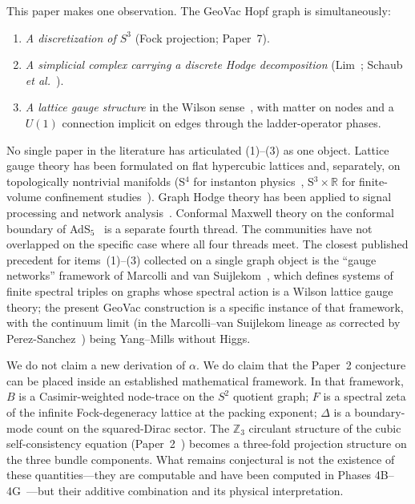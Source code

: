 \documentclass[aps,pra,twocolumn,superscriptaddress,longbibliography]{revtex4-2}
\begin{document}
This paper makes one observation.  The GeoVac Hopf graph is
simultaneously:
\begin{enumerate}
\item \emph{A discretization of $S^3$} (Fock projection; Paper~7).
\item \emph{A simplicial complex carrying a discrete Hodge
  decomposition} (Lim~\cite{Lim2020}; Schaub \emph{et
  al.}~\cite{Schaub2020}).
\item \emph{A lattice gauge structure} in the Wilson
  sense~\cite{Wilson1974}, with matter on nodes and a $U(1)$
  connection implicit on edges through the ladder-operator phases.
\end{enumerate}
No single paper in the literature has articulated (1)--(3) as one
object.  Lattice gauge theory has been formulated on flat hypercubic
lattices and, separately, on topologically nontrivial manifolds (S\({}^4\) for
instanton physics~\cite{BergLuscher1981,Luscher1982}, S\({}^3 \times
\mathbb{R}\) for finite-volume confinement
studies~\cite{Aharony2004}).  Graph Hodge theory has been applied to
signal processing and network analysis~\cite{Lim2020,Schaub2020}.
Conformal Maxwell theory on the conformal boundary of
AdS$_5$~\cite{EastwoodSinger1985,Maldacena1998} is a separate fourth
thread.  The communities have not overlapped on the specific case
where all four threads meet.  The closest published precedent for
items~(1)--(3) collected on a single graph object is the
``gauge networks'' framework of Marcolli and van
Suijlekom~\cite{MarcolliVanSuijlekom2014}, which defines systems of
finite spectral triples on graphs whose spectral action is a Wilson
lattice gauge theory; the present GeoVac construction is a specific
instance of that framework, with the continuum limit (in the
Marcolli--van Suijlekom lineage as corrected by
Perez-Sanchez~\cite{PerezSanchez2024,PerezSanchez2025Comment}) being
Yang--Mills without Higgs.

We do not claim a new derivation of $\alpha$.  We do claim that the
Paper~2 conjecture can be placed inside an established mathematical
framework.  In that framework, $B$ is a Casimir-weighted node-trace
on the $S^2$ quotient graph; $F$ is a spectral zeta of the infinite
Fock-degeneracy lattice at the packing exponent; $\Delta$ is a
boundary-mode count on the squared-Dirac sector.  The $\mathbb{Z}_3$
circulant structure of the cubic self-consistency equation
(Paper~2~\cite{Paper2}) becomes a three-fold projection structure on
the three bundle components.  What remains conjectural is not the
existence of these quantities---they are computable and have been
computed in Phases 4B--4G~\cite{Paper2}---but their additive
combination and its physical interpretation.
\end{document}
